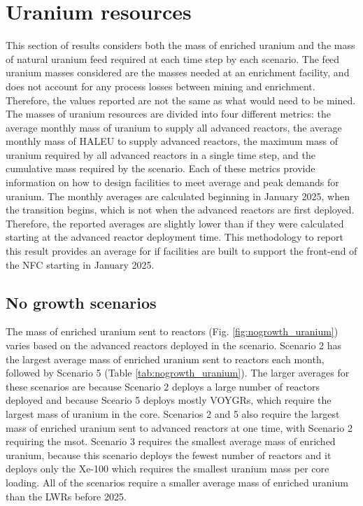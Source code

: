 \section{Uranium resources}
This section of results considers  
both the mass of enriched uranium and the mass of natural uranium feed 
required at each time step by each scenario. The feed uranium masses 
considered are the masses needed at an enrichment facility,
and does not account for any process losses between mining and 
enrichment. Therefore, the values reported are not the same as what would 
need to be mined. The masses of uranium resources are divided into four 
different metrics: the average monthly mass of uranium to supply all 
advanced reactors, the average monthly mass of \gls{HALEU} to supply 
advanced reactors, the maximum mass of uranium required by all advanced 
reactors in a single time step, and the cumulative mass required by the 
scenario. Each of these metrics provide information 
on how to design facilities to meet average and peak demands for 
uranium. The monthly averages are calculated beginning in January 2025, 
when the transition begins, which is not when the advanced reactors 
are first deployed. Therefore, the reported averages are slightly lower 
than if they were calculated starting at the advanced reactor deployment 
time. 
This methodology to report this result provides an average for if 
facilities are built to support the front-end of the \gls{NFC} starting 
in January 2025. 

\subsection{No growth scenarios}
The mass of enriched uranium sent to reactors (Fig. \ref{fig:nogrowth_uranium})
varies based on the advanced reactors deployed in the scenario. 
Scenario 2 has the largest average mass of enriched uranium sent to 
reactors each month, followed by Scenario 5 (Table 
\ref{tab:nogrowth_uranium}). The larger averages for these scenarios are 
because Scenario 2 deploys a large number of reactors deployed and 
because Sceario 5 deploys mostly VOYGRs, which 
require the largest mass of uranium in the core.
Scenarios 2 and 5 also require the largest mass of enriched uranium sent 
to advanced reactors at one time, with Scenario 2 requiring the msot. 
Scenario 3 requires the smallest average 
mass of enriched uranium, because this scenario deploys the fewest number 
of reactors and it deploys only the Xe-100 which requires the smallest 
uranium mass per core loading. All of the scenarios require a smaller 
average mass of enriched uranium than the \glspl{LWR} before 2025. 

